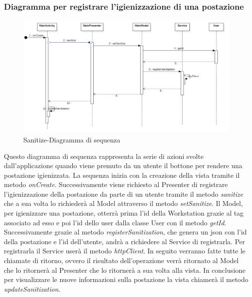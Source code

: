 \subsubsection{Diagramma per registrare l'igienizzazione di una postazione} 
\begin{figure}[H]
	\centering
	\includegraphics[width=16cm]{res/images/apputenti-mainSanitizeSeq.png}
	\caption{Sanitize-Diagramma di sequenza}
	\label{fig:Sanitize-Diagramma di sequenza}
\end{figure}
Questo diagramma di sequenza rappresenta la serie di azioni svolte dall'applicazione quando viene premuto da un utente il bottone per rendere una postazione igienizzata.
La sequenza inizia con la creazione della vista tramite il metodo \textit{onCreate}.
Successivamente viene richiesto al Presenter di registrare l'igienizzazione della postazione da parte di un utente tramite il metodo \textit{sanitize} che a sua volta lo richiederà al Model attraverso il metodo \textit{setSanitize}.
Il Model, per igienizzare una postazione, otterrà prima l'id della Workstation grazie al tag associato ad esso e poi l'id dello user dalla classe User con il metodo \textit{getId}.
Successivamente grazie al metodo \textit{registerSanitization}, che genera un json con l'id della postazione e l'id dell'utente, andrà a richiedere al Service di registrarla. Per registrarla il Service userà il metodo \textit{httpClient}.
In seguito verranno fatte tutte le chiamate di ritorno, ovvero il risultato dell’operazione verrà ritornato al Model che lo ritornerà al Presenter che lo ritornerà a sua volta alla vista.
In conclusione per visualizzare le nuove informazioni sulla postazione la vista chiamerà il metodo \textit{updateSanitization}.


